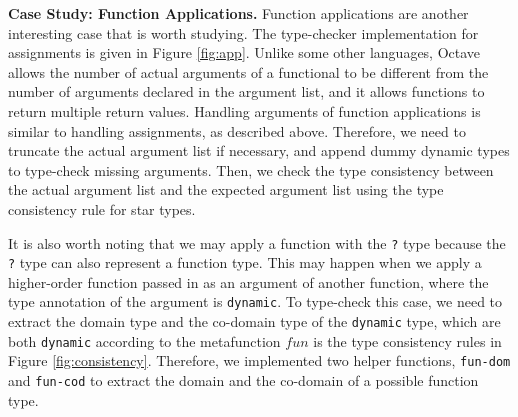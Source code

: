 {\bf Case Study: Function Applications.} Function applications are another interesting case that is worth studying. The type-checker implementation for assignments is given in Figure \ref{fig:app}. Unlike some other languages, Octave allows the number of actual arguments of a functional to be different from the number of arguments declared in the argument list, and it allows functions to return multiple return values. Handling arguments of function applications is similar to handling assignments, as described above. Therefore, we need to truncate the actual argument list if necessary, and append dummy dynamic types to type-check missing arguments. Then, we check the type consistency between the actual argument list and the expected argument list using the type consistency rule for star types.

It is also worth noting that we may apply a function with the {\tt ?} type because the {\tt ?} type can also represent a function type. This may happen when we apply a higher-order function passed in as an argument of another function, where the type annotation of the argument is {\tt dynamic}. To type-check this case, we need to extract the domain type and the co-domain type of the {\tt dynamic} type, which are both {\tt dynamic} according to the metafunction $fun$ is the type consistency rules in Figure \ref{fig:consistency}. Therefore, we implemented two helper functions, {\tt fun-dom} and {\tt fun-cod} to extract the domain and the co-domain of a possible function type.

